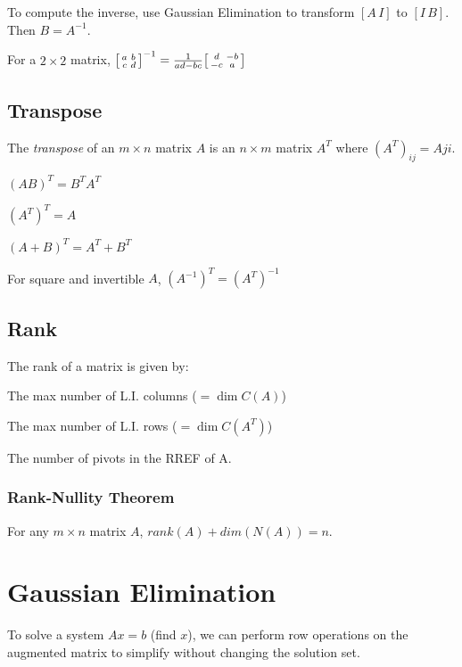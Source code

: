 \documentclass[10pt]{extarticle}
\begin{document}
\begin{multicols*}{2}
To compute the inverse, use Gaussian Elimination to transform $[A\, I]$ to $[I\, B]$. Then $B = A^{-1}$.

For a $2 \times 2$ matrix, $\begin{bsmallmatrix}a & b \\ c & d\end{bsmallmatrix}^{-1} = \frac{1}{ad - bc}\begin{bsmallmatrix}d & -b \\ -c & a\end{bsmallmatrix}$

\subsection{Transpose}
The \emph{transpose} of an $m \times n$ matrix $A$ is an $n \times m$ matrix $A^T$ where $(A^T)_{ij} = A {ji}$.

\begin{compactitem}
	\item \( (AB)^T = B^T A^T \)
	\item \( (A^T)^T = A \)
	\item $ (A + B)^T = A^T + B^T $
	\item For square and invertible $A$, $(A^{-1})^T = (A^T)^{-1} $
\end{compactitem}

\subsection{Rank}
The rank of a matrix is given by:
\begin{compactitem}
\item The max number of L.I. columns ($= \dim C(A)$)
\item The max number of L.I. rows ($= \dim C(A^T)$)
\item The number of pivots in the RREF of A.
\end{compactitem}

\subsubsection{Rank-Nullity Theorem}
For any $m \times n$ matrix $A$, $rank(A) + dim(N(A)) = n$.


\section{Gaussian Elimination}
To solve a system $Ax=b$ (find $x$), we can perform row operations on the augmented matrix to simplify without changing the solution set.


\end{multicols*}
\end{document}
